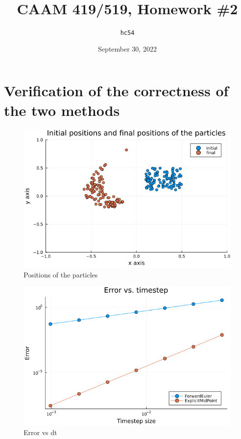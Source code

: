 \documentclass[10pt,a4paper]{article}
\title{CAAM 419/519, Homework \#2}
\author{\texttt{hc54}}
\date{September 30, 2022}
\begin{document}
\maketitle

\section{Verification of the correctness of the two methods}


\begin{figure}[!ht]
        \centering \includegraphics[scale=0.5]{figures/initialandfinal.png}
        \caption{Positions of the particles}
\end{figure}

\begin{figure}[!ht]
        \centering \includegraphics[scale=0.5]{figures/errorvsdt.png}
        \caption{Error vs dt}
\end{figure}
\end{document}
